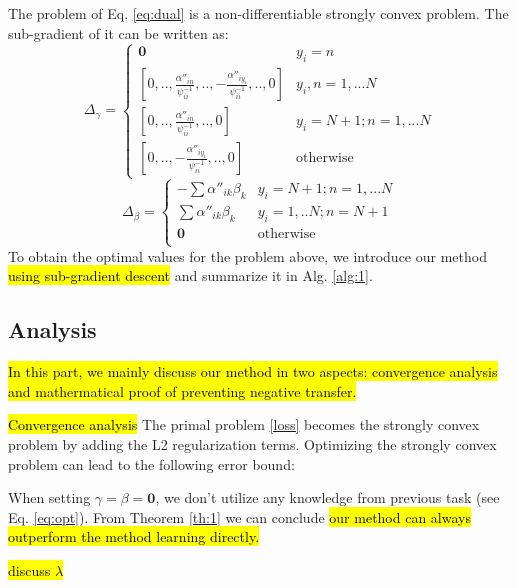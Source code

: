 The problem of Eq. \eqref{eq:dual} is a non-differentiable strongly convex problem. The sub-gradient of it can be written as:
\begin{equation*}
{\Delta _\gamma }=\begin{cases}
\boldsymbol{0}&{y_i}=n\\
\left[ {0,..,\frac{{\alpha ''}_{in}}{\psi _{ii}^{ - 1}},.., - \frac{{\alpha ''}_{i{y_i}}}{\psi _{ii}^{ - 1}},..,0} \right]&{y_i},n = 1,...N\\
\left[ {0,..,\frac{{\alpha ''}_{in}}{\psi _{ii}^{ - 1}},..,0} \right]&{y_i} = N + 1;n = 1,...N\\
\left[ {0,.., - \frac{{\alpha ''}_{i{y_i}}}{\psi _{ii}^{ - 1}},..,0} \right]&\text{otherwise}
\end{cases}
\end{equation*}
\begin{equation*}
{\Delta _\beta }=\begin{cases}
 - \sum {{{\alpha ''}_{ik}}{\beta _k}} &{y_i} = N + 1;n = 1,...N\\
 \sum {{{\alpha ''}_{ik}}{\beta _k}} &{y_i} = 1,..N;n = N+1\\
\boldsymbol{0}&\text{otherwise}\\
\end{cases}
\end{equation*}
To obtain the optimal values for the problem above, we introduce our method \hl{using sub-gradient descent }\cite{BoydCO} and summarize it in Alg. \ref{alg:1}. 


\subsection{Analysis}\label{subsec:analysis}
\hl{In this part, we mainly discuss our method in two aspects: convergence analysis and mathermatical proof of preventing negative transfer.} 

\hl{Convergence analysis}
The primal problem \eqref{loss} becomes the strongly convex problem by adding the L2 regularization terms. Optimizing the strongly convex problem can lead to the following error bound:




When setting $\gamma=\beta = \mathbf{0}$, we don't utilize any knowledge from previous task (see Eq. \eqref{eq:opt}). From Theorem \ref{th:1} we can conclude \hl{our method can always outperform the method learning directly.}

\hl{discuss $\lambda$}